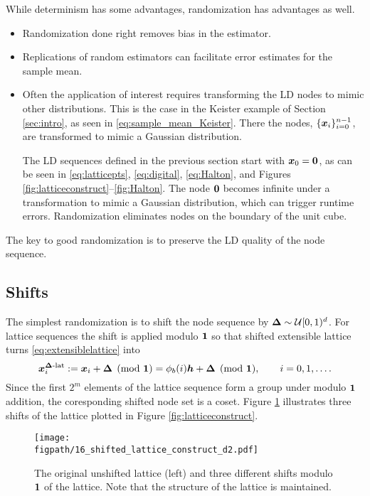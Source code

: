 \documentclass{svproc}
\newcommand{\figpath}{Figures}
\begin{document}
While determinism has some advantages, randomization has advantages as well.
\begin{itemize}
	\item Randomization done right removes bias in the estimator.
	\item Replications of random estimators can facilitate error estimates for the sample mean.
	\item Often the application of interest requires transforming the LD nodes to mimic other distributions.  This is the case in the Keister example of Section \ref{sec:intro}, as seen in \eqref{eq:sample_mean_Keister}.  There the nodes, $\{{\boldsymbol{x}}_i\}_{i=0}^{n-1}$, are transformed to mimic a Gaussian distribution.

	The LD sequences defined in the previous section start with ${\boldsymbol{x}}_0 = {\boldsymbol{0}}$, as can be seen in \eqref{eq:latticepts}, \eqref{eq:digital}, \eqref{eq:Halton}, and Figures \ref{fig:latticeconstruct}--\ref{fig:Halton}.  The node ${\boldsymbol{0}}$ becomes infinite under a transformation to mimic a Gaussian distribution, which can trigger runtime errors.  Randomization eliminates nodes on the boundary of the unit cube.
\end{itemize}
The key to good randomization is to preserve the LD quality of the node sequence.

\subsection{Shifts} \label{sec:shifts}
The simplest randomization is to shift the node sequence by ${\boldsymbol{\Delta}}  \sim {\mathcal{U}}[0,1)^d$.  For lattice  sequences the shift is applied modulo ${\boldsymbol{1}}$ so that shifted extensible lattice turns
\eqref{eq:extensiblelattice} into
\begin{equation} \label{eq:sh_extensiblelattice}
	{\boldsymbol{x}}^{{\boldsymbol{\Delta}}\text{-lat}}_i := {\boldsymbol{x}}_i + {\boldsymbol{\Delta}} \pmod {{\boldsymbol{1}}} =\phi_b( i){\boldsymbol{h}} + {\boldsymbol{\Delta}} \pmod {{\boldsymbol{1}}}, \qquad i = 0, 1 , \ldots.
\end{equation}
Since the first $2^m$ elements of the lattice sequence form a group under modulo ${\boldsymbol{1}}$ addition, the coresponding shifted node set is a coset.  Figure \ref{fig:shift_lat} illustrates three shifts of the lattice plotted in Figure \ref{fig:latticeconstruct}.

\begin{figure}
	\centering
	\texttt{[image: \\figpath/16\_shifted\_lattice\_construct\_d2.pdf]}
	\caption{The original unshifted lattice (left) and three different shifts modulo ${\boldsymbol{1}}$ of the lattice.  Note that the structure of the lattice is maintained. \label{fig:shift_lat}}
\end{figure}
\end{document}
